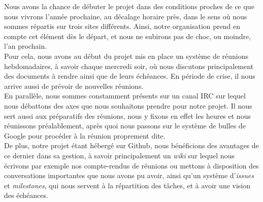 Nous avons la chance de débuter le projet dans des conditions proches de ce que nous vivrons l'année prochaine, au décalage horaire près, dans le sens où nous sommes répartis sur trois sites différents. Ainsi, notre organisation prend en compte cet élément dès le départ, et nous ne subirons pas de choc, ou moindre, l'an prochain.\\

Pour cela, nous avons au début du projet mis en place un système de réunions hebdomadaires, à savoir chaque mercredi soir, où nous discutons principalement des documents à rendre ainsi que de leurs échéances. En période de crise, il nous arrive aussi de prévoir de nouvelles réunions.\\

En parallèle, nous sommes constamment présents sur un canal IRC sur lequel nous débattons des axes que nous souhaitons prendre pour notre projet. Il nous sert aussi aux préparatifs des réunions, nous y fixons en effet les heures et nous réunissons préalablement, après quoi nous passons sur le système de bulles de Google pour procéder à la réunion proprement dite.\\

De plus, notre projet étant hébergé sur Github, nous bénéficions des avantages de ce dernier dans sa gestion, à savoir principalement un \textit{wiki} sur lequel nous écrivons par exemple nos compte-rendus de réunions ou mettons à disposition des conversations importantes que nous avons pu avoir, ainsi qu'un système d'\textit{issues} et \textit{milestones}, qui nous servent à la répartition des tâches, et à avoir une vision des échéances.